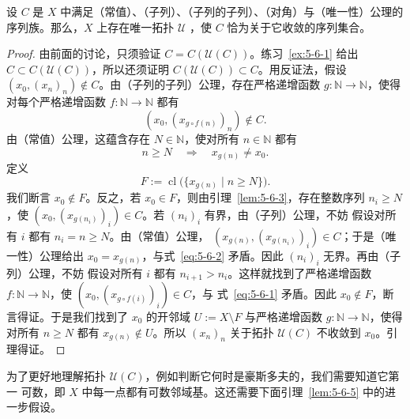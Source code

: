 \begin{lemma}\label{lem:5-6-4}
设 $C$ 是 $X$ 中满足（常值）、（子列）、（子列的子列）、（对角）与（唯一性）公理的
序列族。那么，$X$ 上存在唯一拓扑 $\mathcal U$
，使 $C$
恰为关于它收敛的序列集合。
\end{lemma}

\begin{proof}
由前面的讨论，只须验证 $C=C(\mathcal U(C))$。练习~\ref{ex:5-6-1} 给出
$C\subset C(\mathcal U(C))$，所以还须证明 $C(\mathcal U(C))\subset C$。用反证法，假设
$(x_0,(x_n)_n)\notin C$。由（子列的子列）公理，存在严格递增函数
$g:\mathbb N\to\mathbb N$，使得对每个严格递增函数 $f:\mathbb N\to\mathbb N$ 都有
\begin{equation}\label{eq:5-6-1}
  (x_0,(x_{g\circ f(n)})_n)\notin C.
\end{equation}
由（常值）公理，这蕴含存在 $N\in\mathbb N$，使对所有 $n\in\mathbb N$ 都有
\begin{equation}\label{eq:5-6-2}
  n\ge N\quad\Longrightarrow\quad x_{g(n)}\ne x_0.
\end{equation}
定义
\[
  F:=\operatorname{cl}\bigl(\{x_{g(n)}\mid n\ge N\}\bigr).
\]
我们断言 $x_0\notin F$。反之，若 $x_0\in F$，则由引理~\ref{lem:5-6-3}，存在整数序列
$n_i\ge N$，使 $(x_0,(x_{g(n_i)})_i)\in C$。若 $(n_i)_i$ 有界，由（子列）公理，不妨
假设对所有 $i$ 都有 $n_i=n\ge N$。由（常值）公理，
$(x_{g(n)},(x_{g(n_i)})_i)\in C$；于是（唯一性）公理给出
$x_0=x_{g(n)}$，与式~\eqref{eq:5-6-2} 矛盾。因此 $(n_i)_i$ 无界。再由（子列）公理，不妨
假设对所有 $i$ 都有 $n_{i+1}>n_i$。这样就找到了严格递增函数
$f:\mathbb N\to\mathbb N$，使 $(x_0,(x_{g\circ f(i)})_i)\in C$，与
式~\eqref{eq:5-6-1} 矛盾。因此 $x_0\notin F$，断言得证。于是我们找到了 $x_0$ 的开邻域
$U:=X\setminus F$ 与严格递增函数 $g:\mathbb N\to\mathbb N$，使得对所有 $n\ge N$ 都有
$x_{g(n)}\notin U$。所以 $(x_n)_n$ 关于拓扑 $\mathcal U(C)$ 不收敛到 $x_0$。引理得证。
\end{proof}

为了更好地理解拓扑 $\mathcal U(C)$，例如判断它何时是豪斯多夫的，我们需要知道它第一
可数，即 $X$ 中每一点都有可数邻域基。这还需要下面引理~\ref{lem:5-6-5} 中的进一步假设。

